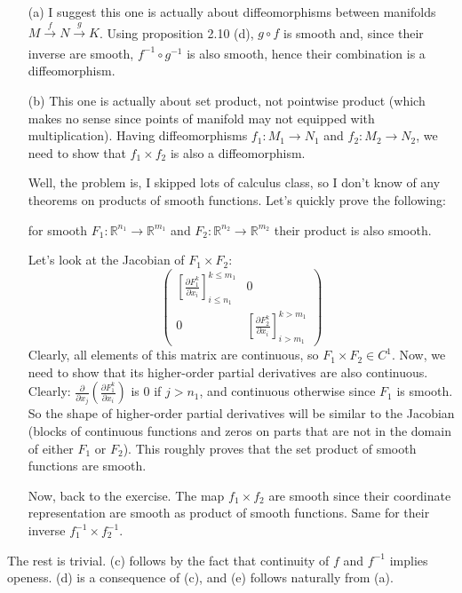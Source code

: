 \documentclass[a4paper]{article}
\begin{document}
\begin{note}[on ex. 2.16]
\begin{enumerate}
    \item[(a)] I suggest this one is actually about diffeomorphisms between manifolds
        $M \xrightarrow[]{f} N \xrightarrow[]{g} K$. Using proposition 2.10 (d),
        $g\circ f$ is smooth and, since their inverse are smooth,
        $f^{-1}\circ g^{-1}$ is also smooth, hence their combination
        is a diffeomorphism.
    \item[(b)] This one is actually about set product, not pointwise product
        (which makes no sense since points of manifold may not equipped with multiplication).
        Having diffeomorphisms $f_1\colon M_1 \to N_1$ and $f_2\colon M_2 \to N_2$,
        we need to show that $f_1 \times f_2$ is also a diffeomorphism.

        Well, the problem is, I skipped lots of calculus class, so I don't know
        of any theorems on products of smooth functions. Let's quickly
        prove the following:

        \begin{lemma}
            for smooth $F_1\colon \mathbb{R}^{n_1} \to \mathbb{R}^{m_1}$ and
            $F_2\colon \mathbb{R}^{n_2} \to \mathbb{R}^{m_2} $ their product is also
            smooth. 
        \end{lemma}
        \begin{prf}
            Let's look at the Jacobian of $F_1 \times F_2$:
            $$
            \begin{pmatrix}
                \left[ \frac{\partial F_1^k}{\partial x_i} \right]_{i \le n_1}^{k \le m_1} & 0 \\
                0 & \left[ \frac{\partial F_2^k}{\partial x_i} \right]_{i>m_1}^{k>m_1}  
            \end{pmatrix} 
            $$
            Clearly, all elements of this matrix are continuous, so $F_1\times F_2 \in C^1 $.
            Now, we need to show that its higher-order partial derivatives are also continuous.
            Clearly:
            $\frac{\partial }{\partial x_j} \left( \frac{\partial F_1^k}{\partial x_i} \right)  $
            is $0$ if $j > n_1$, and continuous otherwise since $F_1$ is smooth. So the shape of higher-order
            partial derivatives will be similar to the Jacobian (blocks of continuous
            functions and zeros on parts that are not in the domain of either $F_1$ or $F_2$).
            This roughly proves that the set product of smooth functions are smooth.
        \end{prf}
            Now, back to the exercise. The map $f_1\times f_2$ are smooth since their coordinate
        representation are smooth as product of smooth functions. Same for their inverse
        $f_1^{-1} \times f_2^{-1}$.

    \end{enumerate}
    The rest is trivial. (c) follows by the fact that continuity of $f$
    and $f^{-1}$ implies openess. (d) is a consequence of (c), and (e) follows
    naturally from (a).
\end{note}
\end{document}
